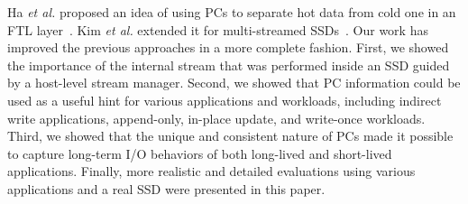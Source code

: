 Ha {\it et al.} proposed an idea of using PCs to separate hot data from cold
one in an FTL layer~\cite{ha}. Kim {\it et al.} extended it for multi-streamed
SSDs~\cite{PCStream}.  Our work has improved the previous approaches in a more
complete fashion. First, we showed the importance of the internal stream that
was performed inside an SSD guided by a host-level stream manager. Second, we
showed that PC information could be used as a useful hint for various
applications and workloads, including indirect write applications, append-only,
in-place update, and write-once workloads. Third, we showed that the unique and
consistent nature of PCs made it possible to capture long-term I/O behaviors of
both long-lived and short-lived applications.  Finally, more realistic and
detailed evaluations using various applications and a real SSD were presented
in this paper.



